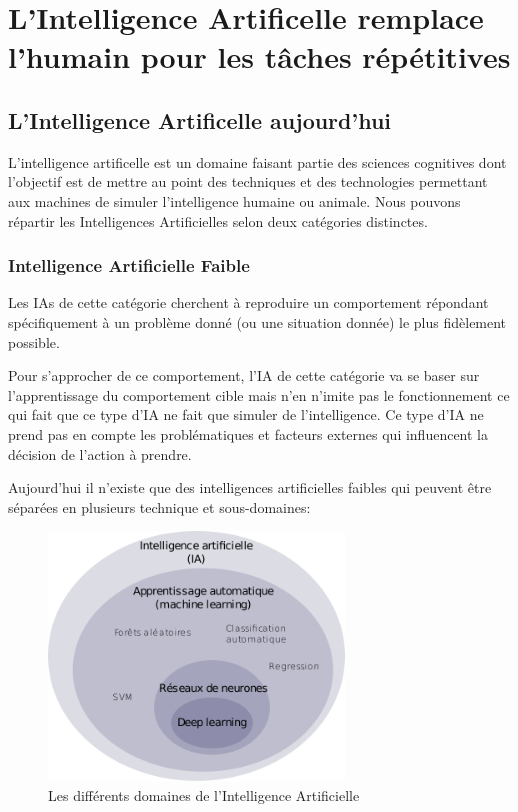 \part{L'Intelligence Artificelle remplace l'humain pour les tâches répétitives}
\chapter{L'Intelligence Artificelle aujourd'hui}
    L'intelligence artificelle est un domaine faisant partie
    des sciences cognitives dont l'objectif est de mettre au
    point des techniques et des technologies permettant aux
    machines de simuler l'intelligence humaine ou animale.
    Nous pouvons répartir les Intelligences Artificielles selon deux catégories distinctes.

    \section{Intelligence Artificielle Faible}
        Les IAs de cette catégorie cherchent à reproduire un comportement
        répondant spécifiquement à un problème donné (ou une situation donnée)
        le plus fidèlement possible.\newline

        Pour s'approcher de ce comportement, l'IA de cette catégorie
        va se baser sur l'apprentissage du comportement cible
        mais n'en n'imite pas le fonctionnement ce qui fait que
        ce type d'IA ne fait que simuler de l'intelligence.
        Ce type d'IA ne prend pas en compte les problématiques et facteurs externes
        qui influencent la décision de l'action à prendre. \newline

        Aujourd'hui il n'existe que des intelligences artificielles faibles qui peuvent
        être séparées en plusieurs technique et sous-domaines: \newline

        \begin{figure}[H]
            \centering
            \includegraphics[width=0.7\textwidth]{Images/aitype}
            \caption{Les différents domaines de l'Intelligence Artificielle}
            \label{fig:DiffDomaineIA}
        \end{figure}

